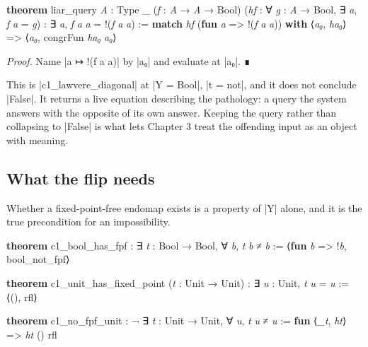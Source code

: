 \documentclass{memoir}
\begin{document}
\begin{LeanVerbatim}
\textbf{theorem} liar_query \textit{A} : Type _ (\textit{f} : \textit{A} → \textit{A} → Bool)
    (\textit{hf} : ∀ \textit{g} : \textit{A} → Bool, ∃ \textit{a}, \textit{f} \textit{a} = \textit{g}) :
    ∃ \textit{a}, \textit{f} \textit{a} \textit{a} = !(\textit{f} \textit{a} \textit{a}) :=
  \textbf{match} \textit{hf} (\textbf{fun} \textit{a} => !(\textit{f} \textit{a} \textit{a})) \textbf{with}
   ⟨\textit{a₀}, \textit{ha₀}⟩ => ⟨\textit{a₀}, congrFun \textit{ha₀} \textit{a₀}⟩

\end{LeanVerbatim}


\emph{Proof.} Name \LeanVerb|a ↦ !(f a a)| by \LeanVerb|a₀| and evaluate at \LeanVerb|a₀|. ∎

This is \LeanVerb|c1_lawvere_diagonal| at \LeanVerb|Y = Bool|, \LeanVerb|t = not|, and it does not conclude
\LeanVerb|False|. It returns a live equation describing the pathology: a query the system
answers with the opposite of its own answer. Keeping the query rather than
collapsing to \LeanVerb|False| is what lets Chapter 3 treat the offending input as an
object with meaning.



\subsection{What the flip needs}\label{Two--Schemas--of--Impossibility-005F-005F-005F--Machine--Checked--Limits--of--Trustworthy--Machine--Learning-005F-005F-005F--and--Why--They--Tighten--with--Capability----The--Diagonal----Three--classical--instances----What--the--flip--needs}

Whether a fixed-point-free endomap exists is a property of \LeanVerb|Y| alone, and it is
the true precondition for an impossibility.

\begin{LeanVerbatim}
\textbf{theorem} c1_bool_has_fpf : ∃ \textit{t} : Bool → Bool, ∀ \textit{b}, \textit{t} \textit{b} ≠ \textit{b} :=
  ⟨\textbf{fun} \textit{b} => !\textit{b}, bool_not_fpf⟩

\end{LeanVerbatim}


\begin{LeanVerbatim}
\textbf{theorem} c1_unit_has_fixed_point
    (\textit{t} : Unit → Unit) : ∃ \textit{u} : Unit, \textit{t} \textit{u} = \textit{u} :=
  ⟨(), rfl⟩

\textbf{theorem} c1_no_fpf_unit :
    ¬ ∃ \textit{t} : Unit → Unit, ∀ \textit{u}, \textit{t} \textit{u} ≠ \textit{u} :=
  \textbf{fun} ⟨\textit{_t}, \textit{ht}⟩ => \textit{ht} () rfl

\end{LeanVerbatim}
\end{document}
